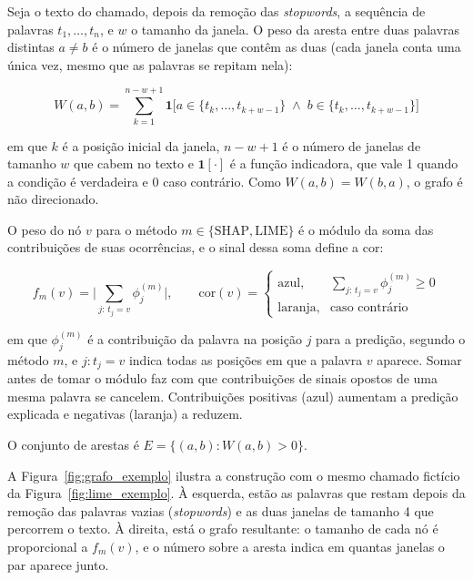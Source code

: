 \documentclass[
    12pt,                %
    openright,           %
    oneside,             %
    a4paper,             %
    english,             %
    brazil               %
]{abntex2}
\begin{document}
Seja o texto do chamado, depois da remoção das \textit{stopwords}, a sequência de palavras $t_1, \dots, t_n$, e $w$ o tamanho da janela. O peso da aresta entre duas palavras distintas $a \neq b$ é o número de janelas que contêm as duas (cada janela conta uma única vez, mesmo que as palavras se repitam nela):

\begin{equation}
W(a,b) = \sum_{k=1}^{n-w+1} \mathbf{1}\Big[ a \in \{t_k, \dots, t_{k+w-1}\} \;\wedge\; b \in \{t_k, \dots, t_{k+w-1}\} \Big]
\label{eq:aresta}
\end{equation}

em que $k$ é a posição inicial da janela, $n-w+1$ é o número de janelas de tamanho $w$ que cabem no texto e $\mathbf{1}[\cdot]$ é a função indicadora, que vale 1 quando a condição é verdadeira e 0 caso contrário. Como $W(a,b)=W(b,a)$, o grafo é não direcionado.

O peso do nó $v$ para o método $m \in \{\mathrm{SHAP}, \mathrm{LIME}\}$ é o módulo da soma das contribuições de suas ocorrências, e o sinal dessa soma define a cor:

\begin{equation}
f_m(v) = \Bigg| \sum_{j:\, t_j = v} \phi_j^{(m)} \Bigg|, \qquad
\mathrm{cor}(v) =
\begin{cases}
\text{azul}, & \sum_{j:\, t_j = v} \phi_j^{(m)} \ge 0 \\
\text{laranja}, & \text{caso contrário}
\end{cases}
\label{eq:no}
\end{equation}

em que $\phi_j^{(m)}$ é a contribuição da palavra na posição $j$ para a predição, segundo o método $m$, e $j:t_j=v$ indica todas as posições em que a palavra $v$ aparece. Somar antes de tomar o módulo faz com que contribuições de sinais opostos de uma mesma palavra se cancelem. Contribuições positivas (azul) aumentam a predição explicada e negativas (laranja) a reduzem.

O conjunto de arestas é $E = \{(a,b) : W(a,b) > 0\}$.

A Figura~\ref{fig:grafo_exemplo} ilustra a construção com o mesmo chamado fictício da Figura~\ref{fig:lime_exemplo}. À esquerda, estão as palavras que restam depois da remoção das palavras vazias (\textit{stopwords}) e as duas janelas de tamanho 4 que percorrem o texto. À direita, está o grafo resultante: o tamanho de cada nó é proporcional a $f_m(v)$, e o número sobre a aresta indica em quantas janelas o par aparece junto.
\end{document}
